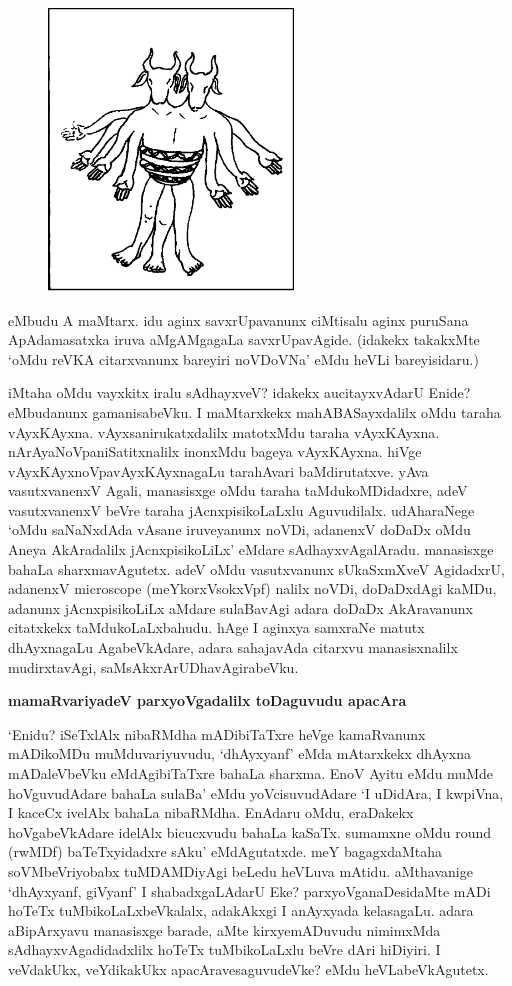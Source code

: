 \begin{figure}
\includegraphics[width=6.5cm]{0208.eps}
\end{figure}

\noindent
eMbudu A maMtarx. idu aginx savxrUpavanunx ciMtisalu aginx puruSana ApAdamasatxka iruva aMgAMgagaLa savxrUpavAgide. (idakekx takakxMte `oMdu reVKA citarxvanunx bareyiri noVDoVNa' eMdu heVLi bareyisidaru.)

iMtaha oMdu vayxkitx iralu sAdhayxveV? idakekx aucitayxvAdarU Enide? eMbudanunx gamanisabeVku. I maMtarxkekx mahABASayxdalilx oMdu taraha vAyxKAyxna. vAyxsanirukatxdalilx matotxMdu taraha vAyxKAyxna. nArAyaNoVpaniSatitxnalilx inonxMdu bageya vAyxKAyxna. hiVge vAyxKAyxnoVpavAyxKAyxnagaLu tarahAvari baMdirutatxve. yAva vasutxvanenxV Agali, manasisxge oMdu taraha taMdukoMDidadxre, adeV vasutxvanenxV beVre taraha jAcnxpisikoLaLxlu Aguvudilalx. udAharaNege `oMdu saNaNxdAda vAsane iruveyanunx noVDi, adanenxV doDaDx oMdu Aneya AkAradalilx jAcnxpisikoLiLx' eMdare sAdhayxvAgalAradu. manasisxge bahaLa sharxmavAgutetx. adeV  oMdu vasutxvanunx sUkaSxmXveV AgidadxrU, adanenxV {\rm microscope} (meYkorxVsokxVpf) nalilx noVDi, doDaDxdAgi kaMDu, adanunx jAcnxpisikoLiLx aMdare sulaBavAgi adara doDaDx AkAravanunx citatxkekx taMdukoLaLxbahudu. hAge I aginxya samxraNe matutx dhAyxnagaLu AgabeVkAdare, adara sahajavAda citarxvu manasisxnalilx mudirxtavAgi, saMsAkxrArUDhavAgirabeVku.

\newpage

{\bigskip
\noindent
{\large\bf mamaRvariyadeV parxyoVgadalilx toDaguvudu apacAra}}\label{page209}
\medskip

\noindent
`Enidu? iSeTxlAlx nibaRMdha mADibiTaTxre heVge kamaRvanunx mADikoMDu muMduvariyuvudu, `dhAyxyanf' eMda mAtarxkekx dhAyxna mADaleVbeVku eMdAgibiTaTxre bahaLa sharxma. EnoV Ayitu eMdu muMde hoVguvudAdare bahaLa sulaBa' eMdu yoVcisuvudAdare `I uDidAra, I kwpiVna, I kaceCx ivelAlx bahaLa nibaRMdha. EnAdaru oMdu, eraDakekx hoVgabeVkAdare idelAlx bicucxvudu bahaLa kaSaTx. sumamxne oMdu {\rm round} (rwMDf) baTeTxyidadxre sAku' eMdAgutatxde. meY bagagxdaMtaha soVMbeVriyobabx tuMDAMDiyAgi beLedu heVLuva mAtidu. aMthavanige `dhAyxyanf, giVyanf' I shabadxgaLAdarU Eke? parxyoVganaDesidaMte mADi hoTeTx tuMbikoLaLxbeVkalalx, adakAkxgi I anAyxyada kelasagaLu. adara aBipArxyavu manasisxge barade, aMte kirxyemADuvudu nimimxMda sAdhayxvAgadidadxlilx hoTeTx tuMbikoLaLxlu beVre dAri hiDiyiri. I veVdakUkx, veYdikakUkx apacAravesaguvudeVke? eMdu heVLabeVkAgutetx.

